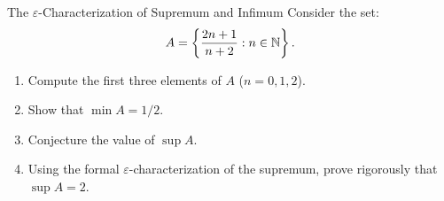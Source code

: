 \begin{exercise}{The $\varepsilon$-Characterization of Supremum and Infimum}
Consider the set:
\[
A = \left\{ \frac{2n + 1}{n + 2} : n \in \mathbb{N} \right\}.
\]
\begin{enumerate}[leftmargin=1.5em,itemsep=2pt]
  \item Compute the first three elements of $A$ ($n = 0, 1, 2$).
  \item Show that $\min A = 1/2$.
  \item Conjecture the value of $\sup A$.
  \item Using the formal $\varepsilon$-characterization of the supremum, prove rigorously that $\sup A = 2$.
\end{enumerate}
\end{exercise}

\begin{tabletworkspace}[5.0cm]
\end{tabletworkspace}

